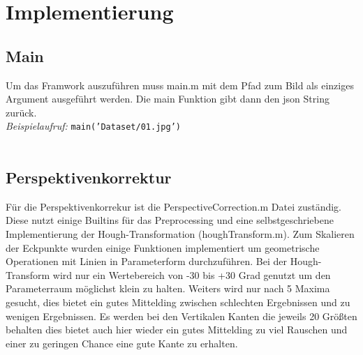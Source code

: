 \documentclass[paper=A4, deutsch]{scrartcl}
\begin{document}

\section{Implementierung}
\subsection{Main}
Um das Framwork auszuführen muss main.m mit dem Pfad zum Bild als einziges Argument ausgeführt werden. Die main Funktion gibt dann den json String zurück.\\
\textit{Beispielaufruf:} \texttt{main('Dataset/01.jpg')}\\
\\
\subsection{Perspektivenkorrektur}
Für die Perspektivenkorrekur ist die PerspectiveCorrection.m Datei zuständig. Diese nutzt einige Builtins für das Preprocessing und eine selbstgeschriebene Implementierung der Hough-Transformation (houghTransform.m). Zum Skalieren der Eckpunkte wurden einige Funktionen implementiert um geometrische Operationen mit Linien in Parameterform durchzuführen. Bei der Hough-Transform wird nur ein Wertebereich von -30 bis +30 Grad genutzt um den Parameterraum möglichst klein zu halten. Weiters wird nur nach 5 Maxima gesucht, dies bietet ein gutes Mittelding zwischen schlechten Ergebnissen und zu wenigen Ergebnissen. Es werden bei den Vertikalen Kanten die jeweils 20 Größten behalten dies bietet auch hier wieder ein gutes Mittelding zu viel Rauschen und einer zu geringen Chance eine gute Kante zu erhalten.\\
\\
\end{document}
